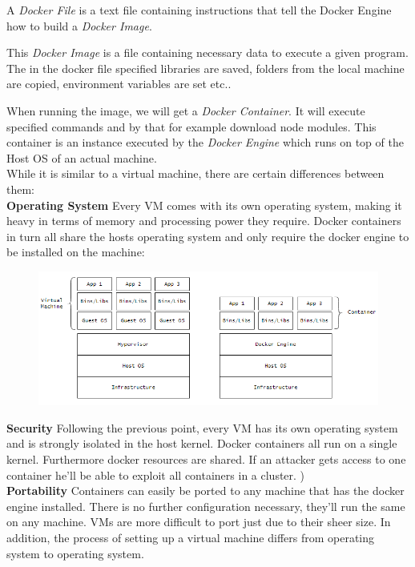 A \emph{Docker File} is a text file containing instructions that tell the Docker Engine how to build a \emph{Docker Image}. \cite{NickDocker}

This \emph{Docker Image} is a file containing necessary data to execute a given program. The in the docker file specified libraries are saved, folders from the local machine are copied, environment variables are set etc.. 

When running the image, we will get a \emph{Docker Container}. It will execute specified commands and by that for example download node modules. This container is an instance executed by the \emph{Docker Engine} which runs on top of the Host OS of an actual machine.
\\

While it is similar to a virtual machine, there are certain differences between them: \\
\textbf{Operating System} Every VM comes with its own operating system, making it heavy in terms of memory and processing power they require. Docker containers in turn all share the hosts operating system and only require the docker engine to be installed on the machine: \cite{GeekDocker}
\begin{figure}[H]
\centering
\includegraphics[scale=.8]{Bilder/DockerVsVM.png}
\label{ex312}
\end{figure}
\noindent
\textbf{Security} Following the previous point, every VM has its own operating system and is strongly isolated in the host kernel. Docker containers all run on a single kernel. Furthermore docker resources are shared. If an attacker gets access to one container he'll be able to exploit  all containers in a cluster. \cite{GeekDocker}) \\
\textbf{Portability} Containers can easily be ported to any machine that has the docker engine installed. There is no further configuration necessary, they'll run the same on any machine. VMs are more difficult to port just due to their sheer size. In addition, the process of setting up a virtual machine differs from operating system to operating system. 


